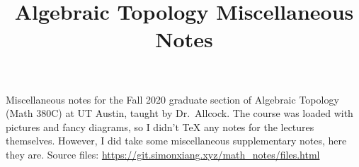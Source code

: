 \documentclass{scrartcl}
\title{Algebraic Topology Miscellaneous Notes}
\begin{document}
\maketitle
Miscellaneous notes for the Fall 2020 graduate section of Algebraic Topology (Math 380C) at UT Austin, taught by Dr.\ Allcock. The course was loaded with pictures and fancy diagrams, so I didn't \TeX{} any notes for the lectures themselves. However, I did take some miscellaneous supplementary notes, here they are. Source files: \url{https://git.simonxiang.xyz/math_notes/files.html}
\tableofcontents
    
    
\end{document}
